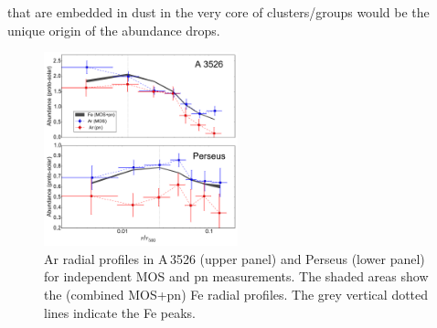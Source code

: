 \documentclass{aa}
\begin{document}
that are embedded in dust in the very core of clusters/groups would be the unique origin of the abundance drops.

\begin{figure}[!]

                \includegraphics[width=0.5\textwidth]{fig_Ar_drop.pdf}

        \caption{Ar radial profiles in A\,3526 (upper panel) and Perseus (lower panel) for independent MOS and pn measurements. The shaded areas show the (combined MOS+pn) Fe radial profiles. The grey vertical dotted lines indicate the Fe peaks.}
\label{fig:Ar_drop}
\end{figure}
\end{document}
